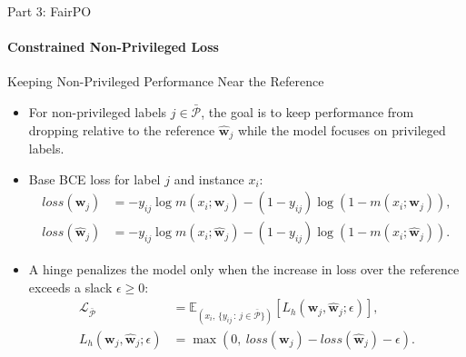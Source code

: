 \documentclass[aspectratio=169]{beamer}
\newcommand{\E}{\mathbb{E}}
\newcommand{\nonprivileged}{\bar{\mathcal{P}}} %
\newcommand{\model}{m} %
\newcommand{\params}{\mathbf{w}} %
\newcommand{\refparams}{\hat{\mathbf{w}}} %
\newcommand{\loss}{\mathcal{L}}
\begin{document}
	\begin{frame}{Part 3: FairPO}
		\framesubtitle{Constrained Non-Privileged Loss}
		\begin{block}{\scriptsize Keeping Non-Privileged Performance Near the Reference}\scriptsize
			\begin{itemize}
				\item For non-privileged labels $j \in \nonprivileged$, the goal is to keep performance from dropping relative to the reference $\refparams_j$ while the model focuses on privileged labels.
				\item Base BCE loss for label $j$ and instance $x_i$:
				\begin{align}
					loss(\params_j) &= -y_{ij} \log \model(x_i;\params_j) - (1-y_{ij})\log (1-\model(x_i;\params_j)), \\
					loss(\refparams_j) &= -y_{ij} \log \model(x_i;\refparams_j) - (1-y_{ij})\log (1-\model(x_i;\refparams_j)).
				\end{align}
				\item A hinge penalizes the model only when the increase in loss over the reference exceeds a slack $\epsilon \ge 0$:
				\begin{align}
					\loss_{\nonprivileged} &= \E_{(x_i,\, \{y_{ij}\,:\, j \in \nonprivileged\})} \left[ L_h(\params_j, \refparams_j; \epsilon) \right], \\
					L_h(\params_j, \refparams_j; \epsilon) &= \max \left( 0,\ loss(\params_j) - loss(\refparams_j) - \epsilon \right).
				\end{align}
			\end{itemize}
		\end{block}
	\end{frame}
	
\end{document}
